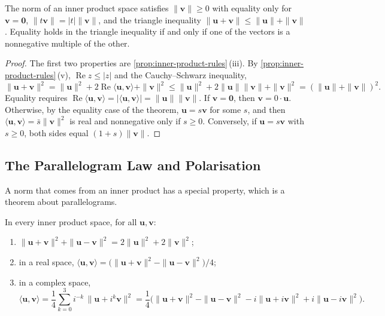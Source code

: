 \begin{corollary}
\label{cor:inner-product-norm}
The norm of an inner product space satisfies $\|\mathbf v\|\ge0$ with equality only for $\mathbf v=\mathbf 0$, $\|t\mathbf v\|=|t|\|\mathbf v\|$, and the triangle inequality $\|\mathbf u+\mathbf v\|\le\|\mathbf u\|+\|\mathbf v\|$. Equality holds in the triangle inequality if and only if one of the vectors is a nonnegative multiple of the other.
\end{corollary}

\begin{proof}
The first two properties are \cref{prop:inner-product-rules}\,(iii). By \cref{prop:inner-product-rules}\,(v), $\operatorname{Re}z\le|z|$ and the Cauchy--Schwarz inequality,
\[
\|\mathbf u+\mathbf v\|^2=\|\mathbf u\|^2+2\operatorname{Re}\langle\mathbf u,\mathbf v\rangle+\|\mathbf v\|^2\le\|\mathbf u\|^2+2\|\mathbf u\|\|\mathbf v\|+\|\mathbf v\|^2=(\|\mathbf u\|+\|\mathbf v\|)^2 .
\]
Equality requires $\operatorname{Re}\langle\mathbf u,\mathbf v\rangle=|\langle\mathbf u,\mathbf v\rangle|=\|\mathbf u\|\|\mathbf v\|$. If $\mathbf v=\mathbf 0$, then $\mathbf v=0\cdot\mathbf u$. Otherwise, by the equality case of the theorem, $\mathbf u=s\mathbf v$ for some $s$, and then $\langle\mathbf u,\mathbf v\rangle=\bar s\|\mathbf v\|^2$ is real and nonnegative only if $s\ge0$. Conversely, if $\mathbf u=s\mathbf v$ with $s\ge0$, both sides equal $(1+s)\|\mathbf v\|$.
\end{proof}

\subsection{The Parallelogram Law and Polarisation}

A norm that comes from an inner product has a special property, which is a theorem about parallelograms.

\begin{proposition}
\label{prop:parallelogram}
In every inner product space, for all $\mathbf u,\mathbf v$:
\begin{enumerate}
\item $\|\mathbf u+\mathbf v\|^2+\|\mathbf u-\mathbf v\|^2=2\|\mathbf u\|^2+2\|\mathbf v\|^2$;
\item in a real space, $\langle\mathbf u,\mathbf v\rangle=\bigl(\|\mathbf u+\mathbf v\|^2-\|\mathbf u-\mathbf v\|^2\bigr)/4$;
\item in a complex space,
\[
\langle\mathbf u,\mathbf v\rangle=\frac14\sum_{k=0}^3i^{-k}\,\|\mathbf u+i^k\mathbf v\|^2=\frac14\bigl(\|\mathbf u+\mathbf v\|^2-\|\mathbf u-\mathbf v\|^2-i\|\mathbf u+i\mathbf v\|^2+i\|\mathbf u-i\mathbf v\|^2\bigr).
\]
\end{enumerate}
\end{proposition}


